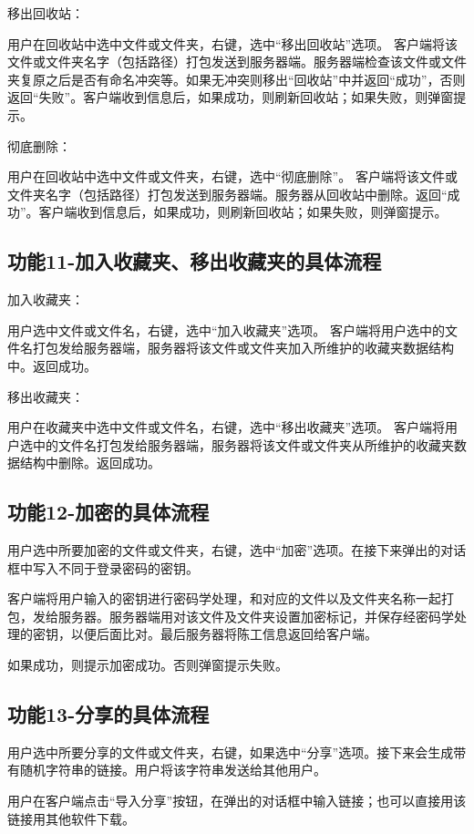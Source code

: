  
移出回收站：

用户在回收站中选中文件或文件夹，右键，选中“移出回收站”选项。
客户端将该文件或文件夹名字（包括路径）打包发送到服务器端。服务器端检查该文件或文件夹复原之后是否有命名冲突等。如果无冲突则移出“回收站”中并返回“成功”，否则返回“失败”。客户端收到信息后，如果成功，则刷新回收站；如果失败，则弹窗提示。

彻底删除：

用户在回收站中选中文件或文件夹，右键，选中“彻底删除”。
客户端将该文件或文件夹名字（包括路径）打包发送到服务器端。服务器从回收站中删除。返回“成功”。客户端收到信息后，如果成功，则刷新回收站；如果失败，则弹窗提示。


\subsection{功能11-加入收藏夹、移出收藏夹的具体流程}
加入收藏夹：

用户选中文件或文件名，右键，选中“加入收藏夹”选项。
客户端将用户选中的文件名打包发给服务器端，服务器将该文件或文件夹加入所维护的收藏夹数据结构中。返回成功。

移出收藏夹：

用户在收藏夹中选中文件或文件名，右键，选中“移出收藏夹”选项。
客户端将用户选中的文件名打包发给服务器端，服务器将该文件或文件夹从所维护的收藏夹数据结构中删除。返回成功。

\subsection{功能12-加密的具体流程}
用户选中所要加密的文件或文件夹，右键，选中“加密”选项。在接下来弹出的对话框中写入不同于登录密码的密钥。

客户端将用户输入的密钥进行密码学处理，和对应的文件以及文件夹名称一起打包，发给服务器。服务器端用对该文件及文件夹设置加密标记，并保存经密码学处理的密钥，以便后面比对。最后服务器将陈工信息返回给客户端。

如果成功，则提示加密成功。否则弹窗提示失败。



\subsection{功能13-分享的具体流程}
用户选中所要分享的文件或文件夹，右键，如果选中“分享”选项。接下来会生成带有随机字符串的链接。用户将该字符串发送给其他用户。

用户在客户端点击“导入分享”按钮，在弹出的对话框中输入链接；也可以直接用该链接用其他软件下载。


